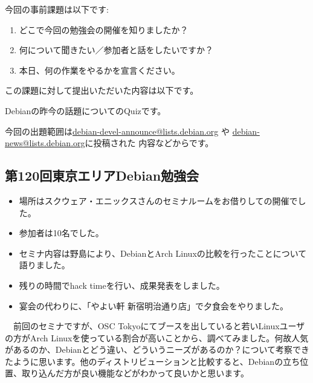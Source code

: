 \documentclass[mingoth,a4paper]{jsarticle}
\begin{document}

今回の事前課題は以下です:
\begin{enumerate}
\item どこで今回の勉強会の開催を知りましたか？
\item 何について聞きたい／参加者と話をしたいですか？
\item 本日、何の作業をやるかを宣言ください。
\end{enumerate}
この課題に対して提出いただいた内容は以下です。
\begin{multicols}{2}
{\small

}
\end{multicols}


 Debianの昨今の話題についてのQuizです。

今回の出題範囲は\url{debian-devel-announce@lists.debian.org} や \url{debian-news@lists.debian.org}に投稿された
内容などからです。

\begin{multicols}{2}

\end{multicols}


\subsection{第120回東京エリアDebian勉強会}

\begin{itemize}
\item 場所はスクウェア・エニックスさんのセミナルームをお借りしての開催でした。
\item 参加者は10名でした。
\item セミナ内容は野島により、DebianとArch Linuxの比較を行ったことについて語りました。
\item 残りの時間でhack timeを行い、成果発表をしました。
\item 宴会の代わりに、「やよい軒 新宿明治通り店」で夕食会をやりました。
\end{itemize} 

　前回のセミナですが、OSC Tokyoにてブースを出していると若いLinuxユーザの方がArch Linuxを使っている割合が高いことから、調べてみました。何故人気があるのか、Debianとどう違い、どういうニーズがあるのか？について考察できたように思います。他のディストリビューションと比較すると、Debianの立ち位置、取り込んだ方が良い機能などがわかって良いかと思います。
\end{document}
